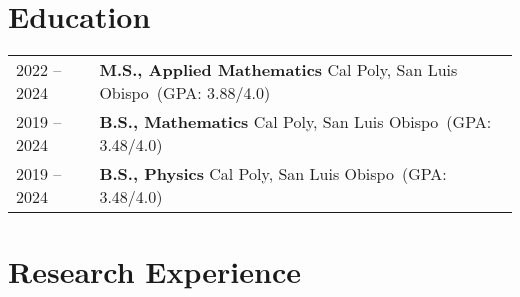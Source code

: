 \documentclass[a4paper,11pt]{article}
\newcommand{\calpoly}{\textcolor{black!55!white}{Cal Poly, San Luis Obispo}}
\begin{document}
\section{Education}
\begin{tabularx}{\linewidth}{@{}l X@{}}
2022 -- 2024 & \textbf{M.S., Applied Mathematics} \hfill\calpoly\ (GPA: 3.88/4.0) \\

2019 -- 2024 & \textbf{B.S., Mathematics} \hfill\calpoly\ (GPA: 3.48/4.0) \\

2019 -- 2024 & \textbf{B.S., Physics} \hfill\calpoly\ (GPA: 3.48/4.0) \\
\end{tabularx}

\section{Research Experience} %
\end{document}
